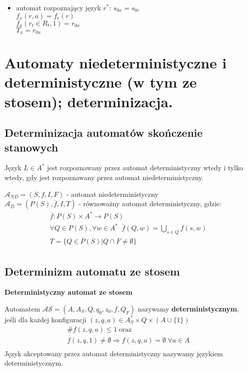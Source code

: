\documentclass[main.tex]{subfiles}
\begin{document}
\begin{itemize}
\begin{itemize}
            \item automat rozpoznający język $r^*$:
            \noindent $s_{0x} = s_{0r}$\\
            \noindent $f_x(r, a) = f_r(r)$ \\
            \noindent $f_x(r_t \in R_t, 1) = r_{0x}$ \\
            \noindent $T_x = r_{0x}$ \\
        \end{itemize}
    \end{itemize}
    \newpage

    \section{Automaty niedeterministyczne i deterministyczne (w tym ze stosem); determinizacja.}

    \subsection{Determinizacja automatów skończenie stanowych}

    \begin{theorem}
        Język $L \in A^*$ jest rozpoznawany przez automat deterministyczny wtedy
        i tylko wtedy, gdy jest rozpoznawany przez automat niedeterministyczny.
    \end{theorem}

    $\mathcal{A}_{ND} = (S, f, I, F)$ - automat niedeterministyczny\\
    \indent$\mathcal{A}_D = (P(S), \overline{f}, I, T)$ - równoważny automat deterministyczny, gdzie:
    \begin{gather*}
        \overline{f} : P(S) \times A^* \rightarrow P(S)\\
        \forall Q \in P(S), \forall w \in A^* \; \; \overline{f}(Q, w) = \bigcup\limits_{s \in Q} f(s, w)\\
        T = \{Q \in P(S) | Q \cap F \neq \emptyset\}\\
    \end{gather*}

    \subsection{Determinizm automatu ze stosem}

    \begin{definition}
        \textbf{Deterministyczny automat ze stosem}

        Automatem $\mathcal{AS} = (A, A_S, Q, q_0, z_0, f, Q_F)$ nazywamy
        \textbf{deterministycznym}, jeśli dla każdej konfiguracji
        $(z, q, a) \in A_S^* \times Q \times (A \cup \{1\})$
        \begin{gather*}
            \# f(z, q, a) \leq 1 \; \mathrm{oraz}\\
            f(z, q, 1) \neq \emptyset \Rightarrow f(z, q, a) = \emptyset \; \forall a \in A\\
        \end{gather*}
        Język akceptowany przez automat deterministyczny nazywamy językiem deterministycznym.
    \end{definition}
\end{document}
